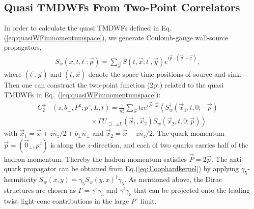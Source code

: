 \documentclass[prd,aps,twocolumn,preprintnumbers, showpacs, nofootinbib,superscriptaddress,notitlepage]{revtex4-1}
\begin{document}
\subsection{Quasi TMDWFs From Two-Point Correlators}
\label{sec:quasi-WF_from_2pt}
In order to calculate the quasi TMDWFs  defined in Eq.(\ref{eq:quasiWFinmomentumspace}), we generate Coulomb-gauge wall-source propagators, 
\begin{align}
S_{w}\left(x, t, t^{\prime} ; \vec{p}\right)=\sum_{\vec{y}} S\left(t, \vec{x} ; t^{\prime}, \vec{y}\right) e^{i \vec{p} \cdot(\vec{y}-\vec{x})}, \label{eq:wallsource}
\end{align}
where $(t^{\prime},\vec{y})$ and $(t,\vec{x})$ denote the space-time positions of source and sink. Then one  can construct the two-point function (2pt) related to the quasi TMDWFs  in Eq.~(\ref{eq:quasiWFinmomentumspace}):
\begin{align}
C_2^{\pm}&	\left(z,b_{\perp},P^z; p^z,L,t \right)=\frac{1}{n_s^3}\sum_{\vec{x}}\mathrm{tr} e^{i\vec{P}\cdot\vec{x}}\left\langle S_w^{\dagger}\left(\vec{x}_1,t,0;-\vec{p}\right)\right. \nonumber\\
&\;\;\;\;\;\;\;\;\;\; \;\;\;\;\;\;\;\;\;\;    \times \left. \Gamma U_{\sqsupset, \pm L}\left(\vec{x}_1,\vec{x}_2\right) S_w\left(\vec{x}_2,t,0;\vec{p} \right)  \right\rangle
\label{eq:nonlocal2pt}
\end{align}
with $\vec{x}_1=\vec{x}+z\hat{n}_z/2+b_{\perp}\hat{n}_{\perp}$ and  $\vec{x}_2=\vec{x}-z \hat{n}_{z}/2$. The quark momentum $\vec{p}=(\vec{0}_{\perp},p^z)$ is along the $z$-direction, and each of two quarks carries half of the hadron momentum. Thereby the hadron momentum satisfies  $\vec{P}=2\vec{p}$. The anti-quark propagator can be obtained from Eq.(\ref{eq:1loophardkernel}) by applying $\gamma_5$-hermiticity $S_w(x,y)=\gamma_5S_w(y,x)^{\dagger}\gamma_5$. As mentioned above, the Dirac structures are chosen as $\Gamma=\gamma^z\gamma_5$ and $\gamma^t\gamma_5$ that can be projected onto the leading twist light-cone contributions in the large $P^z$ limit.
 
\end{document}
